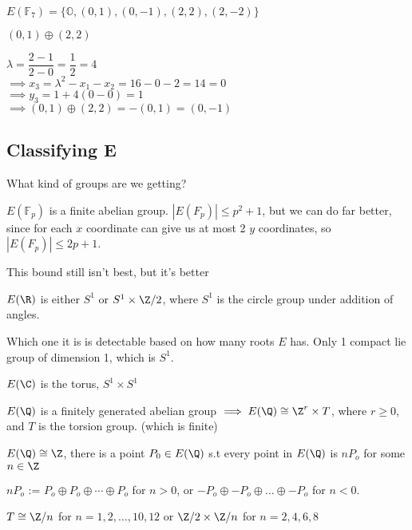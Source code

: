\documentclass[twoside, 10pt]{article}
\newcommand{\F}{\mathbb{F}}
\renewcommand{\O}{\mathbb{O}}
\begin{document}
$E(\F_7) = \{\O, (0, 1), (0, -1), (2, 2), (2, -2)\}$

$(0, 1) \oplus (2, 2)$

$\lambda = \dfrac{2-1}{2-0} = \dfrac{1}{2} = 4$\\
$\implies x_3 = \lambda^2 - x_1 - x_2 = 16 - 0 - 2 = 14 = 0$\\
$\implies y_3 = 1 + 4(0 - 0) = 1$\\
$\implies (0, 1) \oplus (2, 2) = -(0, 1) = (0, -1)$

\subsection{Classifying E} What kind of groups are we getting?

\begin{exm*}
    $E(\F_p)$ is a finite abelian group. $|E(F_p)| \leq p^2 + 1$, but we can do far better, since for each $x$ coordinate can give us at most 2 $y$ coordinates, so $|E(F_p)| \leq 2p + 1$.
\end{exm*}
This bound still isn't best, but it's better

\begin{exm*}
    $E(\R)$ is either $S^1$ or $S^1 \times \Z/2$, where $S^1$ is the circle group under addition of angles.
\end{exm*}
Which one it is is detectable based on how many roots $E$ has. Only 1 compact lie group of dimension 1, which is $S^1$.

\begin{exm*}
    $E(\C)$ is the torus, $S^1 \times S^1$
\end{exm*}

\begin{thm}
    $E(\Q)$ is a finitely generated abelian group $\implies E(\Q) \cong \Z^r \times T$, where $r \geq 0$, and $T$ is the torsion group. (which is finite) %
\end{thm}


\begin{exm*}
    $E(\Q) \cong \Z$, there is a point $P_0 \in E(\Q)$ s.t every point in $E(\Q)$ is $nP_o$ for some $n\in \Z$
\end{exm*}
$nP_o$ := $P_o \oplus P_o \oplus \cdots \oplus P_o$ for $n > 0$, or $-P_o \oplus -P_o \oplus \ldots \oplus -P_o$ for $n < 0$.

\begin{thm}[Mazar, 1977]
    $T \cong \Z/n$ for $n = 1, 2, \ldots, 10, 12$ or $\Z/2 \times \Z/n$ for $n = 2, 4, 6, 8$
\end{thm}
\end{document}
